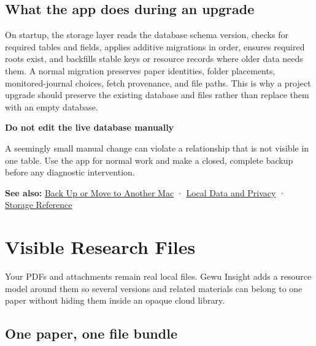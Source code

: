 \documentclass[10pt,letterpaper,oneside]{scrreprt}
\newenvironment{GewuRelated}{\par\nobreak\vspace{3pt}\nobreak\begingroup\small\sffamily\begin{samepage}\noindent}{\par\end{samepage}\endgroup}
\newenvironment{GewuLead}
  {\begin{list}{}{\leftmargin=0pt\rightmargin=0pt\topsep=0pt\partopsep=0pt\parsep=0pt}\item\relax
    \sffamily\fontsize{10.5}{13.2}\selectfont\color{GewuMuted}}
  {\end{list}}
\renewenvironment{quote}
  {\Needspace{5\baselineskip}\begin{tcolorbox}[enhanced,breakable,colback=GewuPale,colframe=GewuPale,boxrule=0pt,
    borderline west={1.6pt}{0pt}{GewuBlue},arc=1.2mm,left=2.5mm,right=2.5mm,top=1.7mm,bottom=1.7mm,
    before skip=4pt,after skip=5pt,fontupper=\color{GewuInk}\small]}
  {\end{tcolorbox}}
\begin{document}
\section{What the app does during an upgrade}\label{what-the-app-does-during-an-upgrade}

On startup, the storage layer reads the database schema version, checks for required tables and fields, applies additive migrations in order, ensures required roots exist, and backfills stable keys or resource records where older data needs them. A normal migration preserves paper identities, folder placements, monitored-journal choices, fetch provenance, and file paths. This is why a project upgrade should preserve the existing database and files rather than replace them with an empty database.

\begin{quote}
\textbf{Do not edit the live database manually}

A seemingly small manual change can violate a relationship that is not visible in one table. Use the app for normal work and make a closed, complete backup before any diagnostic intervention.
\end{quote}

\begin{GewuRelated}
\textbf{See also:} \hyperref[backup-migrate]{Back Up or Move to Another Mac} · \hyperref[privacy]{Local Data and Privacy} · \hyperref[storage-reference]{Storage Reference}
\end{GewuRelated}

\chapter{Visible Research Files}\label{visible-research-files}

\begin{GewuLead}
Your PDFs and attachments remain real local files. Gewu Insight adds a resource model around them so several versions and related materials can belong to one paper without hiding them inside an opaque cloud library.
\end{GewuLead}

\section{One paper, one file bundle}\label{one-paper-one-file-bundle}
\end{document}
